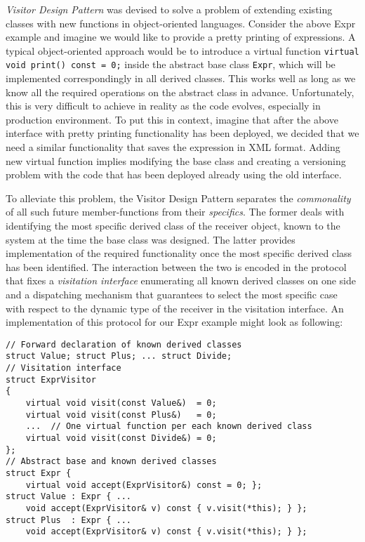 \documentclass[preprint]{sigplanconf}
\makeatletter
\DeclareRobustCommand{\code}[1]{{\lstinline[breaklines=false,escapechar=@]{#1}}}
\makeatother
\begin{document}
\emph{Visitor Design Pattern}\cite{DesignPatterns1993} was devised to solve a problem 
of extending existing classes with new functions in object-oriented languages. 
Consider the above Expr example and imagine we would like to provide a pretty 
printing of expressions. A typical object-oriented approach would be to 
introduce a virtual function \code{virtual void print() const = 0;} inside the 
abstract base class \code{Expr}, which will be implemented correspondingly in all derived 
classes. This works well as long as we know all the required operations on the 
abstract class in advance. Unfortunately, this is very difficult to achieve in 
reality as the code evolves, especially in production environment. To put this 
in context, imagine that after the above interface with pretty printing 
functionality has been deployed, we decided that we need a similar functionality 
that saves the expression in XML format. Adding new virtual function implies 
modifying the base class and creating a versioning problem with the code that 
has been deployed already using the old interface.

To alleviate this problem, the Visitor Design Pattern separates the 
\emph{commonality} of all such future member-functions from their 
\emph{specifics}. The former deals with identifying the most specific derived 
class of the receiver object, known to the system at the time the base class was 
designed. The latter provides implementation of the required functionality once 
the most specific derived class has been identified. The interaction between the 
two is encoded in the protocol that fixes a \emph{visitation interface} 
enumerating all known derived classes on one side and a dispatching mechanism 
that guarantees to select the most specific case with respect to the dynamic 
type of the receiver in the visitation interface. An implementation of this 
protocol for our Expr example might look as following:

\begin{lstlisting}
// Forward declaration of known derived classes
struct Value; struct Plus; ... struct Divide;
// Visitation interface
struct ExprVisitor
{
    virtual void visit(const Value&)  = 0;
    virtual void visit(const Plus&)   = 0;
    ...  // One virtual function per each known derived class
    virtual void visit(const Divide&) = 0;
};
// Abstract base and known derived classes
struct Expr { 
    virtual void accept(ExprVisitor&) const = 0; };
struct Value : Expr { ...
    void accept(ExprVisitor& v) const { v.visit(*this); } };
struct Plus  : Expr { ...
    void accept(ExprVisitor& v) const { v.visit(*this); } };
\end{lstlisting}
\end{document}
